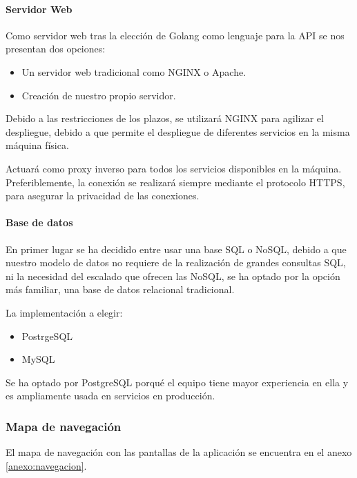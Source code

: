 \documentclass{article}
\begin{document}
\paragraph*{Servidor Web}

Como servidor web tras la elección de Golang como lenguaje para la API se nos presentan dos opciones:

\begin{itemize}
    \item Un servidor web tradicional como NGINX o Apache.
    \item Creación de nuestro propio servidor.
\end{itemize}

Debido a las restricciones de los plazos, se utilizará NGINX para agilizar el despliegue, debido a que permite el despliegue de diferentes servicios en la misma
máquina física.

Actuará como proxy inverso para todos los servicios disponibles en la máquina. Preferiblemente, la conexión se realizará siempre mediante el protocolo HTTPS, para asegurar la
privacidad de las conexiones.

\paragraph*{Base de datos}

En primer lugar se ha decidido entre usar una base SQL o NoSQL, debido a que nuestro modelo de datos no requiere de la realización de grandes consultas 
SQL, ni la necesidad del escalado que ofrecen las NoSQL, se ha optado por la opción más familiar, una base de datos relacional tradicional.

La implementación a elegir:

\begin{itemize}
    \item PostrgeSQL
    \item MySQL
\end{itemize}

Se ha optado por PostgreSQL porqué el equipo tiene mayor experiencia en ella y es ampliamente usada en servicios en producción.


\subsubsection{Mapa de navegación}
El mapa de navegación  con las pantallas de la aplicación se encuentra en el
anexo \ref{anexo:navegacion}.

\end{document}
